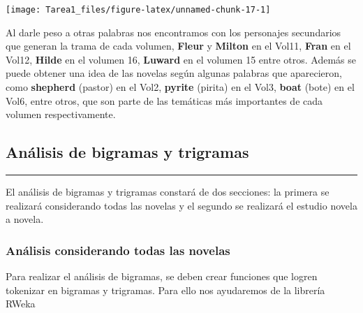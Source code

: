 \documentclass[
]{article}
\begin{document}
\texttt{[image: Tarea1\_files/figure-latex/unnamed-chunk-17-1]}

Al darle peso a otras palabras nos encontramos con los personajes
secundarios que generan la trama de cada volumen, \textbf{Fleur} y
\textbf{Milton} en el Vol11, \textbf{Fran} en el Vol12, \textbf{Hilde}
en el volumen 16, \textbf{Luward} en el volumen 15 entre otros. Además
se puede obtener una idea de las novelas según algunas palabras que
aparecieron, como \textbf{shepherd} (pastor) en el Vol2, \textbf{pyrite}
(pirita) en el Vol3, \textbf{boat} (bote) en el Vol6, entre otros, que
son parte de las temáticas más importantes de cada volumen
respectivamente.

\hypertarget{anuxe1lisis-de-bigramas-y-trigramas}{%
\subsection{\texorpdfstring{\textbf{Análisis de bigramas y
trigramas}}{Análisis de bigramas y trigramas}}\label{anuxe1lisis-de-bigramas-y-trigramas}}

\begin{center}\rule{0.5\linewidth}{0.5pt}\end{center}

El análisis de bigramas y trigramas constará de dos secciones: la
primera se realizará considerando todas las novelas y el segundo se
realizará el estudio novela a novela.

\hypertarget{anuxe1lisis-considerando-todas-las-novelas}{%
\subsubsection{\texorpdfstring{\textbf{Análisis considerando todas las
novelas}}{Análisis considerando todas las novelas}}\label{anuxe1lisis-considerando-todas-las-novelas}}

Para realizar el análisis de bigramas, se deben crear funciones que
logren tokenizar en bigramas y trigramas. Para ello nos ayudaremos de la
librería RWeka
\end{document}
